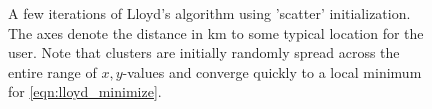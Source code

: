 \begin{figure} %
	\centering
	\caption{A few iterations of Lloyd's algorithm using 'scatter' initialization. The axes denote the distance in km to some typical location for the user. Note that clusters are initially randomly spread across the entire range of $x,y$-values and converge quickly to a local minimum for \eqref{eqn:lloyd_minimize}.}
	\label{fig:lloyds_convergence_scatter}
\end{figure}
